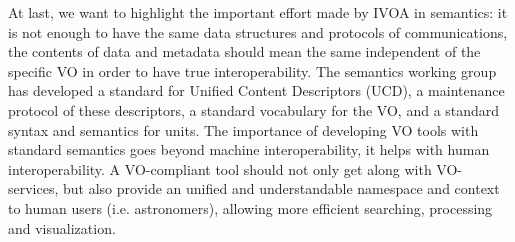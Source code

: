 At last, we want to highlight the important effort made by IVOA in semantics:
it is not enough to have the same data structures and protocols of
communications, the contents of data and metadata should mean the same 
independent of the specific VO in order to have true interoperability.
The semantics working group has developed a standard for Unified Content
Descriptors (UCD), a maintenance protocol of these descriptors, a 
standard vocabulary for the VO, and a standard syntax and semantics for 
units. The importance of developing VO tools with standard semantics goes
beyond machine interoperability, it helps with human interoperability.
A VO-compliant tool should not only get along with VO-services, but also
provide an unified and understandable namespace and context to human users
(i.e. astronomers), allowing more efficient searching, processing and 
visualization.






%


